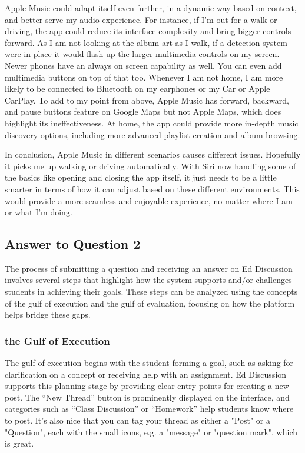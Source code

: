\documentclass[
	letterpaper, %
]{jdf}
\begin{document}
Apple Music could adapt itself even further, in a dynamic way based on context, and better serve my audio experience. For instance, if I’m out for a walk or driving, the app could reduce its interface complexity and bring bigger controls forward. As I am not looking at the album art as I walk, if a detection system were in place it would flash up the larger multimedia controls on my screen. Newer phones have an always on screen capability as well. You can even add multimedia buttons on top of that too. Whenever I am not home, I am more likely to be connected to Bluetooth on my earphones or my Car or Apple CarPlay. To add to my point from above, Apple Music has forward, backward, and pause buttons feature on Google Maps but not Apple Maps, which does highlight its ineffectiveness. At home, the app could provide more in-depth music discovery options, including more advanced playlist creation and album browsing.

In conclusion, Apple Music in different scenarios causes different issues. Hopefully it picks me up walking or driving automatically. With Siri now handling some of the basics like opening and closing the app itself, it just needs to be a little smarter in terms of how it can adjust based on these different environments. This would provide a more seamless and enjoyable experience, no matter where I am or what I’m doing. 
\newpage

\subsection{Answer to Question 2}
The process of submitting a question and receiving an answer on Ed Discussion involves several steps that highlight how the system supports and/or challenges students in achieving their goals. These steps can be analyzed using the concepts of the gulf of execution and the gulf of evaluation, focusing on how the platform helps bridge these gaps.

\subsubsection {the Gulf of Execution}
The gulf of execution begins with the student forming a goal, such as asking for clarification on a concept or receiving help with an assignment. Ed Discussion supports this planning stage by providing clear entry points for creating a new post. The “New Thread” button is prominently displayed on the interface, and categories such as “Class Discussion” or “Homework” help students know where to post. It’s also nice that you can tag your thread as either a "Post" or a "Question", each with the small icons, e.g. a "message" or "question mark", which is great. 
\end{document}

